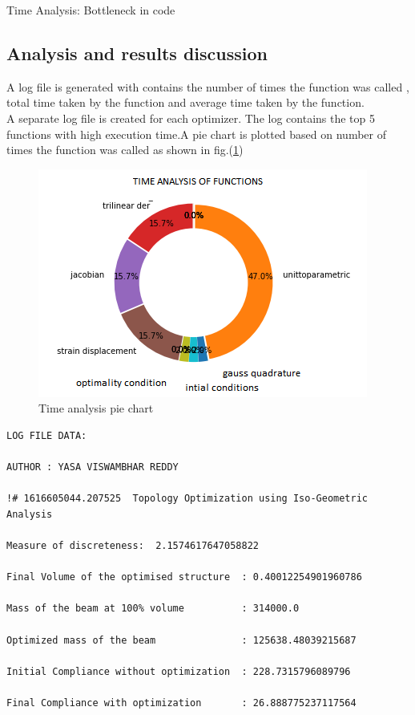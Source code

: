\documentclass[a4paper,12pt,times]{article}
\begin{document}
\begin{section}{Time Analysis: Bottleneck in code}
\subsection{Analysis and results discussion}
A log file is generated with contains the number of times the function was called , total time taken by the function  and average time taken by the function.\\
A separate log file is created for each optimizer. The log contains the top 5 functions with high execution time.A pie chart is plotted based on number of times the function was called as shown in fig.(\ref{Time pie chart})\\
\begin{figure}[H]
	\begin{center}
		\includegraphics[scale=1]{time_analysis_pie_chart.png} 
		\caption{Time analysis pie chart}\label{Time pie chart}
	\end{center}	
\end{figure}

\begin{lstlisting}
LOG FILE DATA:

AUTHOR : YASA VISWAMBHAR REDDY 

!# 1616605044.207525  Topology Optimization using Iso-Geometric Analysis 

Measure of discreteness:  2.1574617647058822

Final Volume of the optimised structure  : 0.40012254901960786

Mass of the beam at 100% volume          : 314000.0

Optimized mass of the beam               : 125638.48039215687

Initial Compliance without optimization  : 228.7315796089796

Final Compliance with optimization       : 26.888775237117564 


\end{lstlisting}
\end{section}
\end{document}
